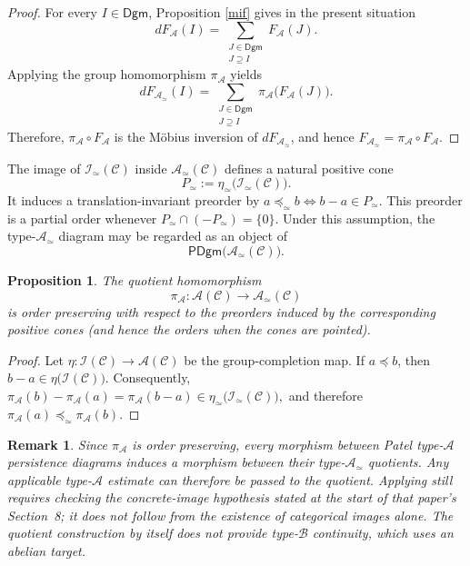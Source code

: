 \documentclass{amsart}
\newtheorem{proposition}[theorem]{Proposition}
\newtheorem{remark}[theorem]{Remark}
\begin{document}
\begin{proof}
For every $I\in\mathsf{Dgm}$, Proposition \ref{mif}  gives in the present situation
\[
dF_{\mathcal A}(I)
=
\sum_{\substack{J\in\mathsf{Dgm}\\J\supseteq I}}
F_{\mathcal A}(J).
\]
Applying the group homomorphism $\pi_{\mathcal A}$ yields
\[
dF_{\mathcal{A}_{\simeq}}(I)
=
\sum_{\substack{J\in\mathsf{Dgm}\\J\supseteq I}}
\pi_{\mathcal A}\bigl(F_{\mathcal A}(J)\bigr).
\]
Therefore,
$\pi_{\mathcal A}\circ F_{\mathcal A}$ is the Möbius inversion of
$dF_{\mathcal{A}_{\simeq}}$, and hence
$F_{\mathcal{A}_{\simeq}} = \pi_{\mathcal A}\circ F_{\mathcal A}.$
\end{proof}

The image of
$\mathcal{I}_{\simeq}(\mathcal{C})$ inside
$\mathcal{A}_{\simeq}(\mathcal{C})$ defines a natural positive cone
\[
P_{\simeq}
:=
\eta_{\simeq}
\bigl(\mathcal{I}_{\simeq}(\mathcal{C})\bigr).
\]
It induces a translation-invariant preorder by
$a\preceq_{\simeq}b
 \Longleftrightarrow 
b-a\in P_{\simeq}.$
This preorder is a partial order whenever $P_{\simeq}\cap(-P_{\simeq})=\{0\}.$ Under this assumption, the type-$\mathcal{A}_{\simeq}$ diagram may
be regarded as an object of
\[
\mathsf{PDgm}
\bigl(\mathcal{A}_{\simeq}(\mathcal{C})\bigr).
\]

\begin{proposition}
The quotient homomorphism
\[
\pi_{\mathcal A}\colon
\mathcal{A}(\mathcal{C})
\longrightarrow
\mathcal{A}_{\simeq}(\mathcal{C})
\]
is order preserving with respect to the preorders induced by the corresponding positive cones (and hence the orders when the cones are pointed).
\end{proposition}

\begin{proof}
Let $\eta:\mathcal I(\mathcal C)\to\mathcal A(\mathcal C)$ be the group-completion map. If $a\preceq b$, then $b-a\in\eta\bigl(\mathcal{I}(\mathcal{C})\bigr).$ Consequently,
$
\pi_{\mathcal A}(b)-\pi_{\mathcal A}(a)
=
\pi_{\mathcal A}(b-a)
\in
\eta_{\simeq}\bigl(\mathcal{I}_{\simeq}(\mathcal{C})\bigr),$
and therefore
$\pi_{\mathcal A}(a)
\preceq_{\simeq}
\pi_{\mathcal A}(b).$
\end{proof}

\begin{remark} \rm
Since $\pi_{\mathcal A}$ is order preserving, every morphism between
Patel type-$\mathcal A$ persistence diagrams induces a morphism
between their type-$\mathcal{A}_{\simeq}$ quotients. Any applicable type-$\mathcal A$ estimate can therefore be passed to the quotient. Applying \cite[Theorem~8.1]{patel2016generalized} still requires checking the concrete-image hypothesis stated at the start of that paper's Section~8; it does not follow from the existence of categorical images alone. The quotient construction by itself does not provide type-$\mathcal B$ continuity, which uses an abelian target.
\end{remark}
\end{document}
